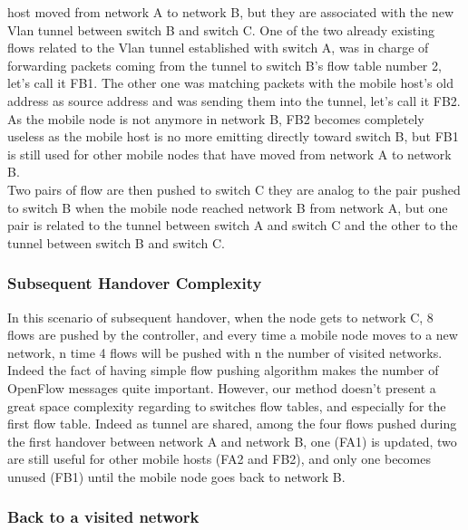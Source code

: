 \documentclass{article}
\begin{document}
host moved from network A to network B, but they are associated with
the new Vlan tunnel between switch B and switch C. One of the two
already existing flows related to the Vlan tunnel established with
switch A, was in charge of forwarding packets coming from the tunnel
to switch B's flow table number 2, let's call it FB1. The other one
was matching packets with the mobile host's old address as source
address and was sending them into the tunnel, let's call it FB2. As
the mobile node is not anymore in network B, FB2 becomes completely
useless as the mobile host is no more emitting directly toward switch
B, but FB1 is still used for other mobile nodes that have moved from
network A to network B.\\
\newline
Two pairs of flow are then pushed to switch C they are analog to the
pair pushed to switch B when the mobile node reached network B from
network A, but one pair is related to the tunnel between switch A and
switch C and the other to the tunnel between switch B and switch C.

\subsubsection{Subsequent Handover Complexity}

In this scenario of subsequent handover, when the node gets to network
C, 8 flows are pushed by the controller, and every time a mobile node
moves to a new network, n time 4 flows will be pushed with n the
number of visited networks. Indeed the fact of having simple flow
pushing algorithm makes the number of OpenFlow messages quite
important. However, our method doesn't present a great space
complexity regarding to switches flow tables, and especially for the
first flow table. Indeed as tunnel are shared, among the four flows
pushed during the first handover between network A and network B, one
(FA1) is updated, two are still useful for other mobile hosts (FA2
and FB2), and only one becomes unused (FB1) until the mobile node
goes back to network B.

\subsubsection{Back to a visited network}
\end{document}
